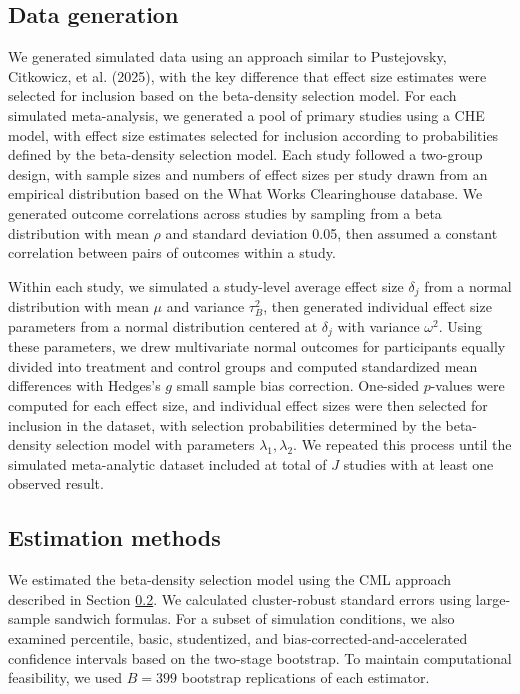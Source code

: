 \documentclass[
  man, donotrepeattitle,floatsintext]{apa7}
\begin{document}
\subsection{Data generation}\label{data-generation}

We generated simulated data using an approach similar to Pustejovsky, Citkowicz, et al. (2025), with the key difference that effect size estimates were selected for inclusion based on the beta-density selection model. For each simulated meta-analysis, we generated a pool of primary studies using a CHE model, with effect size estimates selected for inclusion according to probabilities defined by the beta-density selection model. Each study followed a two-group design, with sample sizes and numbers of effect sizes per study drawn from an empirical distribution based on the What Works Clearinghouse database. We generated outcome correlations across studies by sampling from a beta distribution with mean \(\rho\) and standard deviation 0.05, then assumed a constant correlation between pairs of outcomes within a study.

Within each study, we simulated a study-level average effect size \(\delta_j\) from a normal distribution with mean \(\mu\) and variance \(\tau^2_B\), then generated individual effect size parameters from a normal distribution centered at \(\delta_j\) with variance \(\omega^2\). Using these parameters, we drew multivariate normal outcomes for participants equally divided into treatment and control groups and computed standardized mean differences with Hedges's \(g\) small sample bias correction. One-sided \(p\)-values were computed for each effect size, and individual effect sizes were then selected for inclusion in the dataset, with selection probabilities determined by the beta-density selection model with parameters \(\lambda_1,\lambda_2\).
We repeated this process until the simulated meta-analytic dataset included at total of \(J\) studies with at least one observed result.

\subsection{Estimation methods}\label{estimation-methods}

We estimated the beta-density selection model using the CML approach described in Section \ref{estimation-methods}. We calculated cluster-robust standard errors using large-sample sandwich formulas. For a subset of simulation conditions, we also examined percentile, basic, studentized, and bias-corrected-and-accelerated confidence intervals based on the two-stage bootstrap. To maintain computational feasibility, we used \(B = 399\) bootstrap replications of each estimator.
\end{document}
